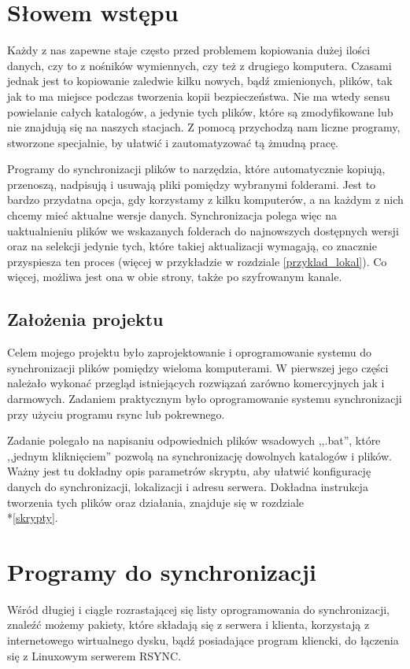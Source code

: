 \section{Słowem wstępu}
Każdy z nas zapewne staje często przed problemem kopiowania dużej ilości danych, czy to z nośników wymiennych, czy też z drugiego komputera. Czasami jednak jest to kopiowanie zaledwie kilku nowych, bądź zmienionych, plików, tak jak to ma miejsce podczas tworzenia kopii bezpieczeństwa. Nie ma wtedy sensu powielanie całych katalogów, a jedynie tych plików, które są zmodyfikowane lub nie znajdują się na naszych stacjach. Z pomocą przychodzą nam liczne programy, stworzone specjalnie, by ułatwić i zautomatyzować tą żmudną pracę. 

Programy do synchronizacji plików to narzędzia, które automatycznie kopiują, przenoszą, nadpisują i usuwają pliki pomiędzy wybranymi folderami. Jest to bardzo przydatna opcja, gdy korzystamy z kilku komputerów, a na każdym z nich chcemy mieć aktualne wersje danych. Synchronizacja polega więc na uaktualnieniu plików we wskazanych folderach do najnowszych dostępnych wersji oraz na selekcji jedynie tych, które takiej aktualizacji wymagają, co znacznie przyspiesza ten proces (więcej w przykładzie w rozdziale \ref{przyklad_lokal}). Co więcej, możliwa jest ona w obie strony, także po szyfrowanym kanale.

\subsection{Założenia projektu}
Celem mojego projektu było zaprojektowanie i oprogramowanie systemu do synchronizacji plików pomiędzy wieloma komputerami. W pierwszej jego części należało wykonać przegląd istniejących rozwiązań zarówno komercyjnych jak i darmowych. Zadaniem praktycznym było oprogramowanie systemu synchronizacji przy użyciu programu rsync lub pokrewnego.

Zadanie polegało na napisaniu odpowiednich plików wsadowych ,,.bat'', które ,,jednym kliknięciem''  pozwolą na synchronizację dowolnych katalogów i plików. Ważny jest tu dokładny opis parametrów skryptu, aby ułatwić konfigurację danych do synchronizacji, lokalizacji i adresu serwera. Dokładna instrukcja tworzenia tych plików oraz działania, znajduje się w rozdziale \\*\ref{skrypty}.

\section{Programy do synchronizacji}
\label{dosynch}
Wśród długiej i ciągle rozrastającej się listy oprogramowania do synchronizacji, znaleźć możemy pakiety, które składają się z serwera i klienta, korzystają z internetowego wirtualnego dysku, bądź posiadające program kliencki, do łączenia się z Linuxowym serwerem RSYNC.

